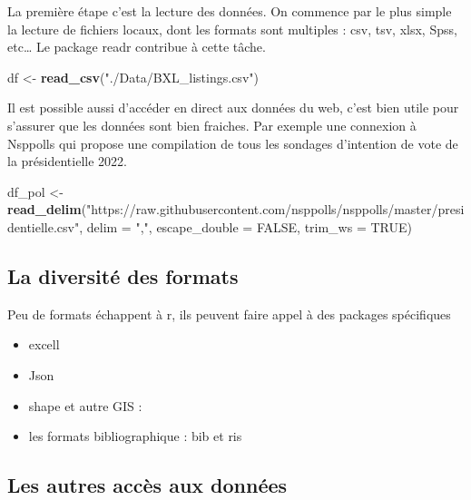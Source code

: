 \documentclass[
]{book}
\newenvironment{Shaded}{\begin{snugshade}}{\end{snugshade}}
\newcommand{\DataTypeTok}[1]{\textcolor[rgb]{0.13,0.29,0.53}{#1}}
\newcommand{\KeywordTok}[1]{\textcolor[rgb]{0.13,0.29,0.53}{\textbf{#1}}}
\newcommand{\NormalTok}[1]{#1}
\newcommand{\OtherTok}[1]{\textcolor[rgb]{0.56,0.35,0.01}{#1}}
\newcommand{\StringTok}[1]{\textcolor[rgb]{0.31,0.60,0.02}{#1}}
\providecommand{\tightlist}{%
  \setlength{\itemsep}{0pt}\setlength{\parskip}{0pt}}
\begin{document}
La première étape c'est la lecture des données. On commence par le plus simple la lecture de fichiers locaux, dont les formats sont multiples : csv, tsv, xlsx, Spss, etc\ldots{} Le package readr contribue à cette tâche.

\begin{Shaded}
\begin{Highlighting}[]
\NormalTok{df <-}\StringTok{ }\KeywordTok{read_csv}\NormalTok{(}\StringTok{"./Data/BXL_listings.csv"}\NormalTok{)}
\end{Highlighting}
\end{Shaded}

Il est possible aussi d'accéder en direct aux données du web, c'est bien utile pour s'assurer que les données sont bien fraiches. Par exemple une connexion à Nsppolls qui propose une compilation de tous les sondages d'intention de vote de la présidentielle 2022.

\begin{Shaded}
\begin{Highlighting}[]
\NormalTok{df_pol <-}\StringTok{ }\KeywordTok{read_delim}\NormalTok{(}\StringTok{"https://raw.githubusercontent.com/nsppolls/nsppolls/master/presidentielle.csv"}\NormalTok{, }
                     \DataTypeTok{delim =} \StringTok{","}\NormalTok{, }\DataTypeTok{escape_double =} \OtherTok{FALSE}\NormalTok{, }\DataTypeTok{trim_ws =} \OtherTok{TRUE}\NormalTok{)}
\end{Highlighting}
\end{Shaded}

\hypertarget{la-diversituxe9-des-formats}{%
\subsection{La diversité des formats}\label{la-diversituxe9-des-formats}}

Peu de formats échappent à r, ils peuvent faire appel à des packages spécifiques

\begin{itemize}
\tightlist
\item
  excell
\item
  Json
\item
  shape et autre GIS :
\item
  les formats bibliographique : bib et ris
\end{itemize}

\hypertarget{les-autres-accuxe8s-aux-donnuxe9es}{%
\subsection{Les autres accès aux données}\label{les-autres-accuxe8s-aux-donnuxe9es}}
\end{document}
